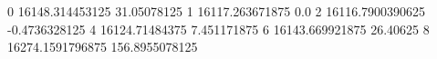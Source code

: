 0 16148.314453125 31.05078125
1 16117.263671875 0.0
2 16116.7900390625 -0.4736328125
4 16124.71484375 7.451171875
6 16143.669921875 26.40625
8 16274.1591796875 156.8955078125
